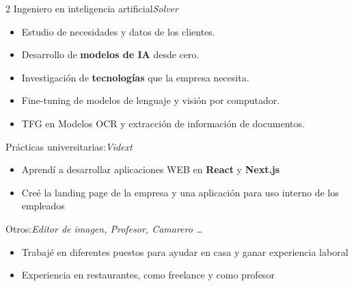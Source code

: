 \documentclass{miquelcv}
\begin{document}
\begin{paracol}{2}
%
  {Ingeniero en inteligencia artificial}{\textit{Solver}}%
  {\begin{itemize}[nosep, left=0pt]
    \item Estudio de necesidades y datos de los clientes.
    \item Desarrollo de \textbf{modelos de IA} desde cero. 
    \item Investigación de \textbf{tecnologías} que la empresa necesita.
    \item Fine-tuning de modelos de lenguaje y visión por computador.
    \item TFG en Modelos OCR y extracción de información de documentos.
   \end{itemize}
   }

%
  {Prácticas universitarias:}{\textit{Vidext}}%
  {\begin{itemize}[nosep, left=0pt]
    \item Aprendí a desarrollar aplicaciones WEB en \textbf{React} y \textbf{Next.js}
    \item Creé la landing page de la empresa y una aplicación para uso interno de los empleados
   \end{itemize}
   }



%
  {Otros:}{\textit{Editor de imagen, Profesor, Camarero \ldots}}%
  {\begin{itemize}[nosep, left=0pt]
    \item Trabajé en diferentes puestos para ayudar en casa y ganar experiencia laboral
    \item Experiencia en restaurantes, como freelance y como profesor
   \end{itemize}}


\end{paracol}
\end{document}

